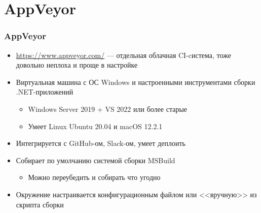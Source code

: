 \documentclass{../../slides-style}
\begin{document}
    \section{AppVeyor}

    \begin{frame}
        \frametitle{AppVeyor}
        \begin{itemize}
            \item \url{https://www.appveyor.com/} --- отдельная облачная CI-cистема, тоже довольно неплоха и проще в настройке
            \item Виртуальная машина с ОС Windows и настроенными инструментами сборки .NET-приложений
            \begin{itemize}
                \item Windows Server 2019 + VS 2022 или более старые
                \item Умеет Linux Ubuntu 20.04 и macOS 12.2.1
            \end{itemize}
            \item Интегрируется с GitHub-ом, Slack-ом, умеет деплоить
            \item Собирает по умолчанию системой сборки MSBuild
            \begin{itemize}
                \item Можно переубедить и собирать что угодно
            \end{itemize}
            \item Окружение настраивается конфигурационным файлом или <<вручную>> из скрипта сборки
        \end{itemize}
    \end{frame}
\end{document}
